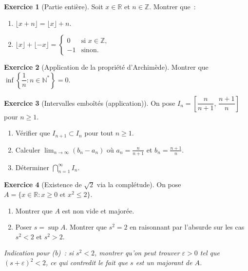\documentclass[12pt,a4paper,openany]{book}
\theoremstyle{definition}
\newtheorem{exercice}{Exercice}[chapter]
\newcommand{\N}{\mathbb{N}}
\newcommand{\Z}{\mathbb{Z}}
\newcommand{\R}{\mathbb{R}}
\newcommand{\eps}{\varepsilon}
\begin{document}
\begin{exercice}[Partie entière]\label{exo:exo-partie-entiere}
  Soit $x \in \R$ et $n \in \Z$. Montrer que~:
  \begin{enumerate}[label=(\alph*)]
    \item $\lfloor x + n \rfloor = \lfloor x \rfloor + n$.
    \item $\lfloor x \rfloor + \lfloor -x \rfloor = \begin{cases} 0 & \text{si } x \in \Z, \\ -1 & \text{sinon.} \end{cases}$
  \end{enumerate}
\end{exercice}

\begin{exercice}[Application de la propriété d'Archimède]\label{exo:exo-archimede}
  Montrer que $\inf\left\{\dfrac{1}{n} : n \in \N^*\right\} = 0$.
\end{exercice}

\begin{exercice}[Intervalles emboîtés (application)]\label{exo:exo-emboites}
  On pose $I_n = \left[\dfrac{n}{n+1},\, \dfrac{n+1}{n}\right]$ pour $n \geq 1$.
  \begin{enumerate}[label=(\alph*)]
    \item Vérifier que $I_{n+1} \subset I_n$ pour tout $n \geq 1$.
    \item Calculer $\lim_{n \to \infty}(b_n - a_n)$ où $a_n = \frac{n}{n+1}$ et $b_n = \frac{n+1}{n}$.
    \item Déterminer $\bigcap_{n=1}^{\infty} I_n$.
  \end{enumerate}
\end{exercice}

\begin{exercice}[Existence de $\sqrt{2}$ via la complétude]\label{exo:exo-sqrt2-sup}
  On pose $A = \{x \in \R : x \geq 0 \text{ et } x^2 \leq 2\}$.
  \begin{enumerate}[label=(\alph*)]
    \item Montrer que $A$ est non vide et majorée.
    \item Poser $s = \sup A$. Montrer que $s^2 = 2$ en raisonnant par l'absurde sur les cas $s^2 < 2$ et $s^2 > 2$.
  \end{enumerate}
  \emph{Indication pour (b)~: si $s^2 < 2$, montrer qu'on peut trouver $\eps > 0$ tel que $(s+\eps)^2 < 2$, ce qui contredit le fait que $s$ est un majorant de $A$.}
\end{exercice}
\end{document}
